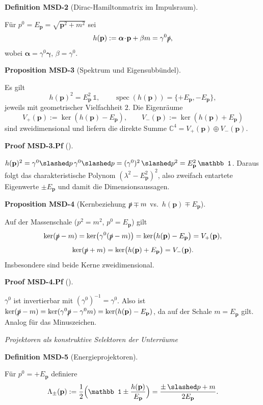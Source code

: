 \documentclass[10pt, letterpaper]{article}
\newcommand{\C}{\mathbb{C}}
\newcommand{\CustomHeading}[3]{%
  \par\medskip\noindent%
  \textbf{#1 #2} \textnormal{(#3)}.\enskip%
}
\newenvironment{DEF}[2]{\begin{unitbox}\CustomHeading{Definition}{#1}{#2}}{\end{unitbox}}
\newenvironment{PROP}[2]{\begin{unitbox}\CustomHeading{Proposition}{#1}{#2}}{\end{unitbox}}
\newenvironment{PROOF}[2]{\begin{unitbox}\CustomHeading{Proof}{#1}{#2}}{\end{unitbox}}
\begin{document}
\begin{DEF}{MSD-2}{Dirac-Hamiltonmatrix im Impulsraum}
Für $p^0=E_{\mathbf p}=\sqrt{\mathbf p^2+m^2}$ sei
\[
h(\mathbf p):=\boldsymbol\alpha\!\cdot\!\mathbf p+\beta m=\gamma^0\slashed p,
\]
wobei $\boldsymbol\alpha=\gamma^0\boldsymbol\gamma$, $\beta=\gamma^0$.
\end{DEF}

\begin{PROP}{MSD-3}{Spektrum und Eigensubbündel}
Es gilt
\[
h(\mathbf p)^2=E_{\mathbf p}^2\,\mathbb 1,\qquad
\operatorname{spec}(h(\mathbf p))=\{+E_{\mathbf p},-E_{\mathbf p}\},
\]
jeweils mit geometrischer Vielfachheit $2$. Die Eigenräume
\[
V_+(\mathbf p):=\ker(h(\mathbf p)-E_{\mathbf p}),\qquad
V_-(\mathbf p):=\ker(h(\mathbf p)+E_{\mathbf p})
\]
sind zweidimensional und liefern die direkte Summe $\C^4=V_+(\mathbf p)\oplus V_-(\mathbf p)$.
\end{PROP}

\begin{PROOF}{MSD-3.Pf}{}
$h(\mathbf p)^2=\gamma^0\slashed p\,\gamma^0\slashed p=(\gamma^0)^2\,\slashed p^2=E_{\mathbf p}^2\,\mathbb 1$.
Daraus folgt das charakteristische Polynom $(\lambda^2-E_{\mathbf p}^2)^2$, also zweifach entartete Eigenwerte $\pm E_{\mathbf p}$ und damit die Dimensionsaussagen.
\end{PROOF}

\begin{PROP}{MSD-4}{Kernbeziehung $\slashed p\mp m$ vs.\ $h(\mathbf p)\mp E_{\mathbf p}$}
Auf der Massenschale ($p^2=m^2$, $p^0=E_{\mathbf p}$) gilt
\[
\ker(\slashed p-m)=\ker\!\big(\gamma^0(\slashed p-m)\big)=\ker\!\big(h(\mathbf p)-E_{\mathbf p}\big)=V_+(\mathbf p),
\]
\[
\ker(\slashed p+m)=\ker\!\big(h(\mathbf p)+E_{\mathbf p}\big)=V_-(\mathbf p).
\]
Insbesondere sind beide Kerne zweidimensional.
\end{PROP}

\begin{PROOF}{MSD-4.Pf}{}
$\gamma^0$ ist invertierbar mit $(\gamma^0)^{-1}=\gamma^0$. Also ist $\ker(\slashed p-m)=\ker(\gamma^0\slashed p-\gamma^0 m)=\ker(h(\mathbf p)-E_{\mathbf p})$, da auf der Schale $m=E_{\mathbf p}$ gilt. Analog für das Minuszeichen.
\end{PROOF}

\emph{Projektoren als konstruktive Selektoren der Unterräume}

\begin{DEF}{MSD-5}{Energieprojektoren}
Für $p^0=+E_{\mathbf p}$ definiere
\[
\Lambda_\pm(\mathbf p):=\frac{1}{2}\Big(\mathbb 1 \pm \frac{h(\mathbf p)}{E_{\mathbf p}}\Big)
=\frac{\pm\,\slashed p + m}{2E_{\mathbf p}}.
\]
\end{DEF}
\end{document}
